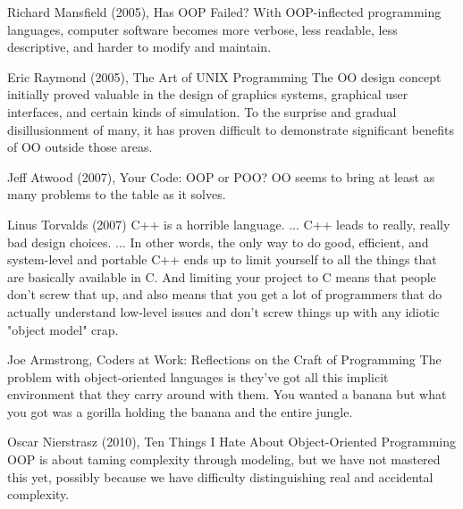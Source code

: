 \documentclass[12pt]{book}
\begin{document}
\begin{kodequote}{Richard Mansfield (2005), Has OOP Failed?}
	With OOP-inflected programming languages, computer software becomes more verbose, less readable, less descriptive, and harder to modify and maintain.
\end{kodequote}

\begin{kodequote}{Eric Raymond (2005), The Art of UNIX Programming}
	The OO design concept initially proved valuable in the design of graphics systems, graphical user interfaces, and certain kinds of simulation. To the surprise and gradual disillusionment of many, it has proven difficult to demonstrate significant benefits of OO outside those areas.
\end{kodequote}

\begin{kodequote}{Jeff Atwood (2007), Your Code: OOP or POO?}
	OO seems to bring at least as many problems to the table as it solves.
\end{kodequote}


\begin{kodequote}{Linus Torvalds (2007)}
	C++ is a horrible language. ... C++ leads to really, really bad design choices. ... In other words, the only way to do good, efficient, and system-level and portable C++ ends up to limit yourself to all the things that are basically available in C. And limiting your project to C means that people don't screw that up, and also means that you get a lot of programmers that do actually understand low-level issues and don't screw things up with any idiotic "object model" crap.
\end{kodequote}

\begin{kodequote}{Joe Armstrong, Coders at Work: Reflections on the Craft of Programming}
	The problem with object-oriented languages is they've got all this implicit environment that they carry around with them. 
	You wanted a banana but what you got was a gorilla holding the banana and the entire jungle.
\end{kodequote}

\begin{kodequote}{Oscar Nierstrasz (2010), Ten Things I Hate About Object-Oriented Programming}
	OOP is about taming complexity through modeling, but we have not mastered this yet, possibly because we have difficulty distinguishing real and accidental complexity.
\end{kodequote}
\end{document}
